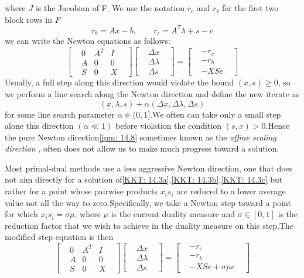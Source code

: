 where $J$ is the Jacobian of F. We use the notation $r_c$ and $r_b$ for the first two block rows in $F$
\[
    r_b = Ax - b, \qquad    r_c = A^T\lambda + s -c \tag{14.7}\label{ipm: 14.7}
\]
we can write the Newton equations as follows:
\[
    \begin{bmatrix}
        & 0 & A^T & I & \\
        & A & 0 & 0 & \\
        & S & 0 & X
    \end{bmatrix}
    \begin{bmatrix}
        & \Delta x &\\
        & \Delta \lambda & \\
        & \Delta s &
    \end{bmatrix} =
    \begin{bmatrix}
        & -r_c &\\
        & -r_b & \\
        & -XSe &
    \end{bmatrix}\tag{14.8}\label{ipm: 14.8}
\]
Usually, a full step along this direction would violate the bound $(x, s) \geq 0$, so we perform a line search
along the Newton direction and define the new iterate as
\[
    (x, \lambda,s)  + \alpha(\Delta x, \Delta \lambda, \Delta s)
\]
for some line search parameter $\alpha \in (0, 1]$.We often can take only a small step alone this direction $(\alpha \ll 1)$
before violation the condition $(s,x) > 0$.Hence the pure Newton direction\eqref{ipm: 14.8} sometimes known as the
\textit{affine scaling direction }, often does not allow us to make much progress toward a solution.
\par Most primal-dual methods use a less aggressive Newton direction, one that does not aim directly for a solution
of\eqref{KKT: 14.3a},\eqref{KKT: 14.3b},\eqref{KKT: 14.3c} but rather for a point whose pairwise products $x_i s_i$ are
reduced to a lower average value \textemdash not all the way to zero.Specifically, we take a Newton step toward a point
for which $x_i s_i = \sigma \mu$, where $\mu$ is the current duality measure and $\sigma \in [0, 1] $ is the reduction
factor that we wish to achieve in the duality measure on this step.The modified step equation is then
\[
    \begin{bmatrix}
        & 0 & A^T & I & \\
        & A & 0 & 0 & \\
        & S & 0 & X
    \end{bmatrix}
    \begin{bmatrix}
        & \Delta x &\\
        & \Delta \lambda & \\
        & \Delta s &
    \end{bmatrix} =
    \begin{bmatrix}
        & -r_c &\\
        & -r_b & \\
        & -XSe + \sigma\mu e &
    \end{bmatrix}\tag{14.9}\label{ipm: 14.9}
\]
